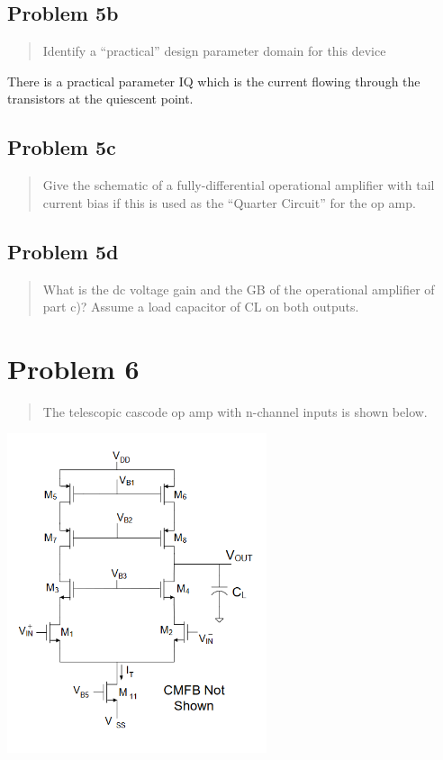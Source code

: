 \documentclass[10pt,a4paper]{article}
\let\oldsubsection\subsection
\renewcommand{\subsection}{%
    \setcounter{equation}{0}%
    \oldsubsection%
}
\begin{document}
\subsection{Problem 5b}
\begin{quote}
Identify a “practical” design parameter domain for this device
\end{quote}

There is a practical parameter IQ which is the current flowing through the transistors at the quiescent point.

\subsection{Problem 5c}
\begin{quote}
Give the schematic of a fully-differential operational amplifier with tail
current bias if this is used as the “Quarter Circuit” for the op amp.
\end{quote}



\subsection{Problem 5d}
\begin{quote}
What is the dc voltage gain and the GB of the operational amplifier of part c)?
Assume a load capacitor of CL on both outputs.
\end{quote}

\section{Problem 6}
\begin{quote}
The telescopic cascode op amp with n-channel inputs is shown below.
\end{quote}
\includegraphics[width=3in]{images/Problem6.png} \\
\end{document}
